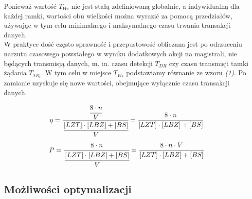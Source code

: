 \documentclass[a4paper,twoside]{article}
\begin{document}
	Ponieważ wartość $ T_{Wi} $ nie jest stałą zdefiniowaną globalnie, a indywidualną dla każdej ramki, wartości obu wielkości można wyrazić za pomocą przedziałów, używając w tym celu minimalnego i maksymalnego czasu trwania transakcji danych. \\
	W praktyce dość często sprawność i przepustowość obliczana jest po odrzuceniu narzutu czasowego powstałego w wyniku dodatkowych akcji na magistrali, nie będących transmisją danych, m. in. czasu detekcji $ T_{DR} $ czy czasu transmisji tamki żądania $ T_{TR_i} $. W tym celu w miejsce $ T_{Wi} $ podstawiamy równanie ze wzoru \textit{(1)}. Po zamianie uzyskuje się nowe wartości, obejmujące wyłącznie czasu transakcji danych.
	
	\begin{equation}
	\eta = \cfrac{\cfrac{8\cdot n}{V}}{\cfrac{[LZT] \cdot [LBZ]+[BS]}{V}} = \cfrac{8\cdot n}{[LZT] \cdot [LBZ]+[BS]}
	\end{equation}
	\begin{equation}
	P = \cfrac{8\cdot n}{\cfrac{[LZT] \cdot [LBZ]+[BS]}{V}} = \cfrac{8\cdot n \cdot V}{[LZT] \cdot [LBZ]+[BS]}
	\end{equation}
	
		
	\subsection{Możliwości optymalizacji}
	
\end{document}
